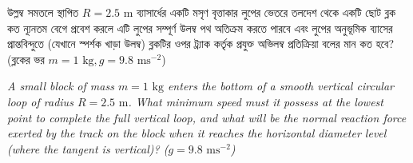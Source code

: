 \documentclass[12pt, a4paper]{article}
\begin{document}
\newpage

\begin{tcolorbox}[questionbox={প্রশ্ন (Question) 36}]
    \noindent
    উল্লম্ব সমতলে স্থাপিত $R = 2.5\text{ m}$ ব্যাসার্ধের একটি মসৃণ বৃত্তাকার লুপের ভেতরে তলদেশ থেকে একটি ছোট ব্লক কত ন্যূনতম বেগে প্রবেশ করলে এটি লুপের সম্পূর্ণ উলম্ব পথ অতিক্রম করতে পারবে এবং লুপের অনুভূমিক ব্যাসের প্রান্তবিন্দুতে (যেখানে স্পর্শক খাড়া উলম্ব) ব্লকটির ওপর ট্র্যাক কর্তৃক প্রযুক্ত অভিলম্ব প্রতিক্রিয়া বলের মান কত হবে? (ব্লকের ভর $m = 1\text{ kg}, g = 9.8\text{ ms}^{-2}$)
    
    \vspace{0.8em}
    \begin{english}
    \noindent\textit{\color{darkgray}
    A small block of mass $m = 1\text{ kg}$ enters the bottom of a smooth vertical circular loop of radius $R = 2.5\text{ m}$. What minimum speed must it possess at the lowest point to complete the full vertical loop, and what will be the normal reaction force exerted by the track on the block when it reaches the horizontal diameter level (where the tangent is vertical)? ($g = 9.8\text{ ms}^{-2}$)
    }
    \end{english}
\end{tcolorbox}
\end{document}
